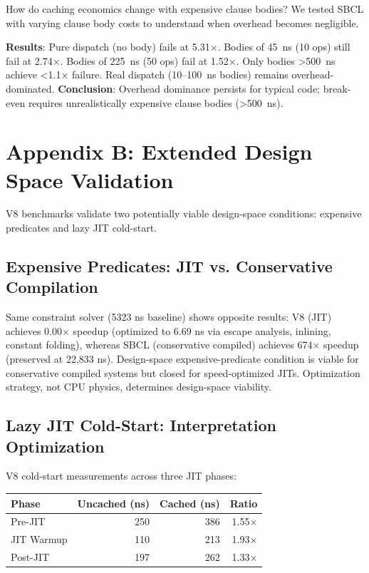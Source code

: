 \documentclass[sigplan,final,acmsmall,review,screen]{acmart}
\begin{document}
How do caching economics change with expensive clause bodies? We tested SBCL with varying clause body costs to understand when overhead becomes negligible.

\textbf{Results}: Pure dispatch (no body) fails at 5.31×. Bodies of 45~ns (10 ops) still fail at 2.74×. Bodies of 225~ns (50 ops) fail at 1.52×. Only bodies >500~ns achieve <1.1× failure. Real dispatch (10--100~ns bodies) remains overhead-dominated. \textbf{Conclusion}: Overhead dominance persists for typical code; break-even requires unrealistically expensive clause bodies (>500~ns).

\section*{Appendix B: Extended Design Space Validation}
\label{app:design-space-validation}

V8 benchmarks validate two potentially viable design-space conditions: expensive predicates and lazy JIT cold-start.

\subsection{Expensive Predicates: JIT vs. Conservative Compilation}

Same constraint solver (5323 ns baseline) shows opposite results: V8 (JIT) achieves 0.00× speedup (optimized to 6.69 ns via escape analysis, inlining, constant folding), whereas SBCL (conservative compiled) achieves 674× speedup (preserved at 22,833 ns). Design-space expensive-predicate condition is viable for conservative compiled systems but closed for speed-optimized JITs. Optimization strategy, not CPU physics, determines design-space viability.

\subsection{Lazy JIT Cold-Start: Interpretation Optimization}

V8 cold-start measurements across three JIT phases:
\begin{center}
\begin{tabular}{lrrr}
\toprule
Phase & Uncached (ns) & Cached (ns) & Ratio \\
\midrule
Pre-JIT & 250 & 386 & 1.55× \\
JIT Warmup & 110 & 213 & 1.93× \\
Post-JIT & 197 & 262 & 1.33× \\
\bottomrule
\end{tabular}
\end{center}
\end{document}
